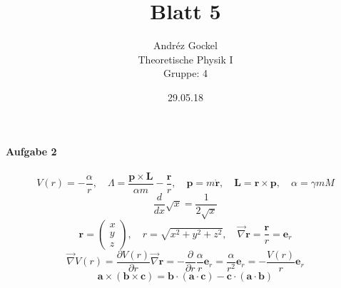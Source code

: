 \documentclass[12pt,a4paper,ngerman]{article}
\newcommand{\vc}[1]{\boldsymbol{#1}}
\newcommand{\vl}{\vc{\varLambda}}
\begin{document}
\title{Blatt 5}
\author{Andréz Gockel\\ 
Theoretische Physik I\\
Gruppe: 4}
\date{29.05.18}
\maketitle
\paragraph{Aufgabe 2}
$$V(r) = -\frac{\alpha}{r}, \quad \vl = \frac{\vc{p} \times \vc{L}}{\alpha m} -  \frac{\vc{r}}{r}, \quad \vc{p}=m\vc{\dot{r}}, \quad \vc{L}=\vc{r}\times \vc{p}, \quad \alpha = \gamma m M$$ 
$$\frac{d}{dx} \sqrt{x} = \frac{1}{2\sqrt{x}}$$
$$\vc{r} = \begin{pmatrix} x \\ y \\ z \end{pmatrix} ,\quad r = \sqrt{x^2+y^2+z^2}, \quad \vec{\nabla} \vc{r} = \frac{\vc{r}}{r} = \vc{e}_r$$
\begin{equation}
	\vec{\nabla} V(r) = \frac{\partial V(r)}{\partial r} \vec{\nabla} \vc{r} = -\frac{\partial}{\partial r} \frac{\alpha}{r}\vc{e}_r = \frac{\alpha}{r^2}\vc{e}_r = -\frac{V(r)}{r}\vc{e}_r
\end{equation}
\begin{equation}
	\vc{a} \times (\vc{b} \times \vc{c}) = \vc{b} \cdot (\vc{a} \cdot \vc{c}) - \vc{c} \cdot ( \vc{a}\cdot \vc{b})
\end{equation}
\end{document}

